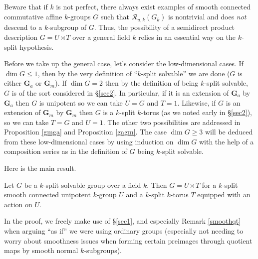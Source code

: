 \documentclass[10pt]{article}
\renewcommand{\(}{\left(}
\renewcommand{\)}{\right)}
\numberwithin{thm}{subsection}
\begin{document}
\begin{remark} Beware that if $k$ is not perfect,
there always exist examples of smooth connected commutative affine 
$k$-groups $G$ such that $\mathscr{R}_{u,\overline{k}}(G_{\overline{k}})$ is
nontrivial and does {\em not} descend to a $k$-subgroup of $G$.
Thus, the possibility of a semidirect product description
$G = U \rtimes T$ over a general field $k$ relies in an essential way on the
$k$-split hypothesis.
\end{remark}

Before we take up the general case, let's consider the low-dimensional cases.
If $\dim G \le 1$, then by the very definition of ``$k$-split solvable''
we are done ($G$ is either $\mathbf{G}_a$ or $\mathbf{G}_m$).
If $\dim G = 2$ then by the definition of being $k$-split solvable,
$G$ is of the sort considered in \S\ref{sec2}.  In particular,
if it is an extension of $\mathbf{G}_a$ by $\mathbf{G}_a$ then $G$ is unipotent
so we can take $U = G$ and $T = 1$.
Likewise, if $G$ is an extension of
$\mathbf{G}_m$ by $\mathbf{G}_m$ then $G$ is a $k$-split $k$-torus
(as we noted early in \S\ref{sec2}), so we can take $T = G$ and $U = 1$.
The other two possibilities are addressed in Proposition \ref{gmga} and
Proposition \ref{gagm}.  The case $\dim G \ge 3$ will be deduced from these low-dimensional
cases by using induction on $\dim G$ with the help of a composition series
as in the definition of $G$ being $k$-split solvable.  

Here is the main result. 

\begin{thm}  Let $G$ be a $k$-split solvable group over a field $k$.
Then $G = U \rtimes T$ for a $k$-split smooth connected unipotent $k$-group $U$
and a $k$-split $k$-torus $T$ equipped with an action on $U$.
\end{thm}

In the proof, we freely make use of \S\ref{sec1}, and especially Remark \ref{smoothqt}
when arguing ``as if'' we were using ordinary groups (especially not needing
to worry about smoothness issues when forming certain preimages through
quotient maps by smooth normal $k$-subgroups). 
\end{document}
